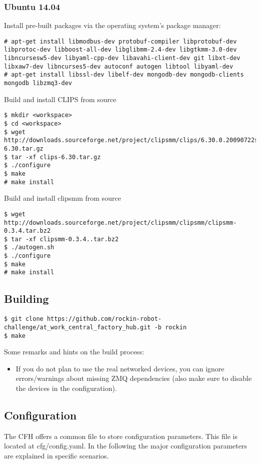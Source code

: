\documentclass{article}
\begin{document}
\subsubsection{Ubuntu 14.04}
Install pre-built packages via the operating system's package manager:
\begin{lstlisting}
# apt-get install libmodbus-dev protobuf-compiler libprotobuf-dev libprotoc-dev libboost-all-dev libglibmm-2.4-dev libgtkmm-3.0-dev libncursesw5-dev libyaml-cpp-dev libavahi-client-dev git libxt-dev libxaw7-dev libncurses5-dev autoconf autogen libtool libyaml-dev
# apt-get install libssl-dev libelf-dev mongodb-dev mongodb-clients mongodb libzmq3-dev
\end{lstlisting}
%
Build and install CLIPS from source
\begin{lstlisting}
$ mkdir <workspace>
$ cd <workspace>
$ wget http://downloads.sourceforge.net/project/clipsmm/clips/6.30.0.20090722svn/clips-6.30.tar.gz
$ tar -xf clips-6.30.tar.gz
$ ./configure
$ make
# make install
\end{lstlisting}
%
Build and install clipsmm from source
\begin{lstlisting}
$ wget http://downloads.sourceforge.net/project/clipsmm/clipsmm/clipsmm-0.3.4.tar.bz2
$ tar -xf clipsmm-0.3.4..tar.bz2
$ ./autogen.sh
$ ./configure
$ make
# make install
\end{lstlisting}

\subsection{Building}
\begin{lstlisting}
$ git clone https://github.com/rockin-robot-challenge/at_work_central_factory_hub.git -b rockin
$ make
\end{lstlisting}
%
Some remarks and hints on the build process:
\begin{itemize}
  \item If you do not plan to use the real networked devices, you can ignore errors/warnings about missing ZMQ
    dependencies (also make sure to disable the devices in the configuration).
\end{itemize}

\subsection{Configuration}
The CFH offers a common file to store configuration parameters. This file is located at cfg/config.yaml. In the
following the major configuration parameters are explained in specific scenarios.
\end{document}
